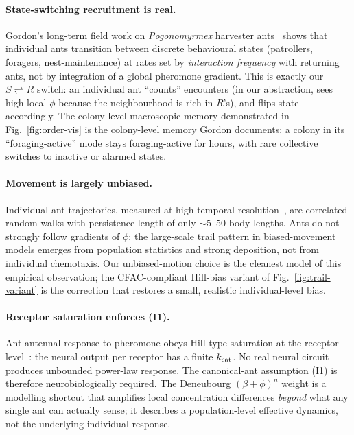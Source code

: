 \documentclass[10pt,a4paper,twocolumn]{article}
\theoremstyle{definition}
\begin{document}
\paragraph{State-switching recruitment is real.}
Gordon's long-term field work on \emph{Pogonomyrmex}
harvester ants~\citep{Gordon2010} shows that individual ants
transition between discrete behavioural states (patrollers,
foragers, nest-maintenance) at rates set by \emph{interaction
frequency} with returning ants, not by integration of a global
pheromone gradient.  This is exactly our
$S \rightleftharpoons R$ switch: an individual ant
``counts'' encounters (in our abstraction, sees high local
$\phi$ because the neighbourhood is rich in $R$'s), and flips
state accordingly.  The colony-level macroscopic memory
demonstrated in Fig.~\ref{fig:order-vis} is the
colony-level memory Gordon documents: a colony in its
``foraging-active'' mode stays foraging-active for hours,
with rare collective switches to inactive
or alarmed states.

\paragraph{Movement is largely unbiased.}
Individual ant trajectories, measured at high temporal
resolution~\citep{Fourcassié2010, Challet2005}, are correlated
random walks with persistence length of only
$\sim 5$--$50$ body lengths.  Ants do not strongly follow
gradients of $\phi$; the large-scale trail pattern in
biased-movement models emerges from population statistics
and strong deposition, not from individual chemotaxis.  Our
unbiased-motion choice is the cleanest model of this empirical
observation; the CFAC-compliant Hill-bias variant of
Fig.~\ref{fig:trail-variant} is the correction that restores
a small, realistic individual-level bias.

\paragraph{Receptor saturation enforces (I1).}
Ant antennal response to pheromone obeys Hill-type saturation
at the receptor level~\citep{Hill1913, Detrain2006}: the
neural output per receptor has a finite $k_{\rm cat}$.  No
real neural circuit produces unbounded power-law response.
The canonical-ant assumption (I1) is therefore neurobiologically
required.  The Deneubourg $(\beta+\phi)^n$ weight is a
modelling shortcut that amplifies local concentration
differences \emph{beyond} what any single ant can actually
sense; it describes a population-level effective dynamics, not
the underlying individual response.
\end{document}
